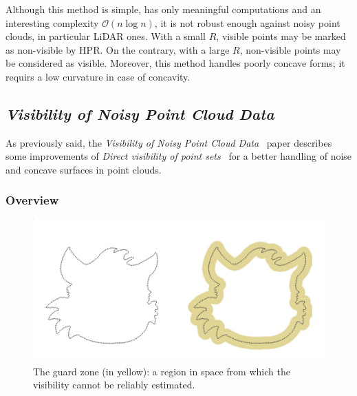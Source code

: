 Although this method is simple, has only meaningful computations and an interesting complexity $\mathcal{O}(n\log{}n)$, it is not robust enough against noisy point clouds, in particular LiDAR ones. With a small $R$, visible points may be marked as non-visible by HPR. On the contrary, with a large $R$, non-visible points may be considered as visible. Moreover, this method handles poorly concave forms; it requirs a low curvature in case of concavity.


\subsection{\emph{Visibility of Noisy Point Cloud Data}}
\label{subsc:noisy}
As previously said, the \emph{Visibility of Noisy Point Cloud Data}~\cite{vis2} paper describes some improvements of \emph{Direct visibility of point sets}~\cite{vis1} for a better handling of noise and concave surfaces in point clouds.

\subsubsection{Overview}
\begin{figure}[h]
  \centering
  \includegraphics[scale=0.2]{img/epsilon.png}
  \caption{The guard zone (in yellow): a region in space from which the visibility cannot be reliably estimated.}
  \label{fig:epsilon}
\end{figure}

